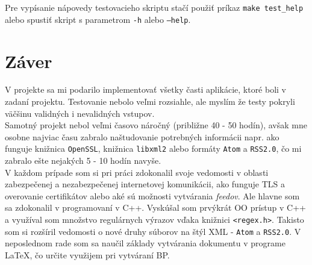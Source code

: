 \documentclass[a4paper, 11pt]{article}
\begin{document}
    Pre vypísanie nápovedy testovacieho skriptu stačí použiť príkaz \texttt{make test\_help} alebo spustiť skript s parametrom \texttt{-h} alebo \texttt{--help}.    

    \section{Záver}
    \label{endeSchluss}
    V projekte sa mi podarilo implementovať všetky časti aplikácie, ktoré boli v zadaní projektu. Testovanie nebolo veľmi rozsiahle, ale myslím že testy pokryli väčšinu validných i nevalidných vstupov. \\
    
     Samotný projekt nebol veľmi časovo náročný (približne 40 - 50 hodín), avšak mne osobne najviac času zabralo naštudovanie potrebných informácii napr. ako funguje knižnica \texttt{OpenSSL}, knižnica \texttt{libxml2} alebo formáty \texttt{Atom} a \texttt{RSS2.0}, čo mi zabralo ešte nejakých 5 - 10 hodín navyše. \\

    V každom prípade som si pri práci zdokonalil svoje vedomosti v oblasti zabezpečenej a nezabezpečenej internetovej komunikácii, ako funguje TLS a overovanie certifikátov alebo aké sú možnosti vytvárania \textit{feedov}. Ale hlavne som sa zdokonalil v programovaní v C++. Vyskúšal som prvýkrát OO prístup v C++ a využíval som množstvo regulárnych výrazov vďaka knižnici \texttt{<regex.h>}. Takisto som si rozšíril vedomosti o nové druhy súborov na štýl XML - \texttt{Atom} a \texttt{RSS2.0}. V neposlednom rade som sa naučil základy vytvárania dokumentu v programe \LaTeX, čo určite využijem pri vytváraní BP.

    \clearpage
    \renewcommand{\refname}{Zdroje}
    
    
 
\end{document}
